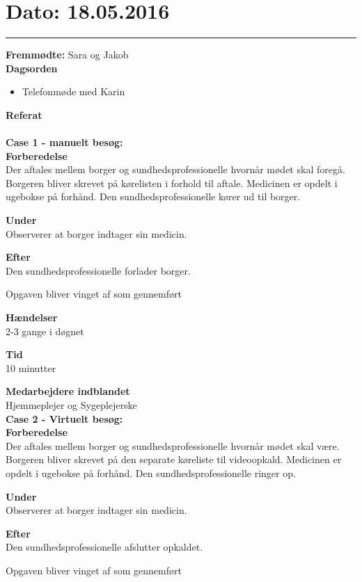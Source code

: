 

\section{Dato: 18.05.2016}
\hrule

\textbf{Fremmødte:} Sara og Jakob 
\\
\textbf{Dagsorden}
\begin{itemize}
	\item Telefonmøde med Karin
\end{itemize}

\textbf{Referat} \\
\\
\textbf{Case 1 - manuelt besøg:}\\
\textbf{Forberedelse}\\
Der aftales mellem borger og sundhedsprofessionelle hvornår mødet skal foregå. 
Borgeren bliver skrevet på kørelisten i forhold til aftale. 
Medicinen er opdelt i ugebokse på forhånd. 
Den sundhedsprofessionelle kører ud til borger. 

\textbf{Under}\\
Observerer at borger indtager sin medicin. 

\textbf{Efter}\\
Den sundhedsprofessionelle forlader borger.

Opgaven bliver vinget af som gennemført

\textbf{Hændelser}\\
2-3 gange i døgnet

\textbf{Tid}\\
10 minutter 

\textbf{Medarbejdere indblandet}\\
Hjemmeplejer og Sygeplejerske\\


\textbf{Case 2 - Virtuelt besøg:}\\
\textbf{Forberedelse}\\
Der aftales mellem borger og sundhedsprofessionelle hvornår mødet skal være. 
Borgeren bliver skrevet på den separate køreliste til videoopkald. 
Medicinen er opdelt i ugebokse på forhånd. 
Den sundhedsprofessionelle ringer op. 

\textbf{Under}\\
Observerer at borger indtager sin medicin. 

\textbf{Efter}\\
Den sundhedsprofessionelle afslutter opkaldet. 

Opgaven bliver vinget af som gennemført 

